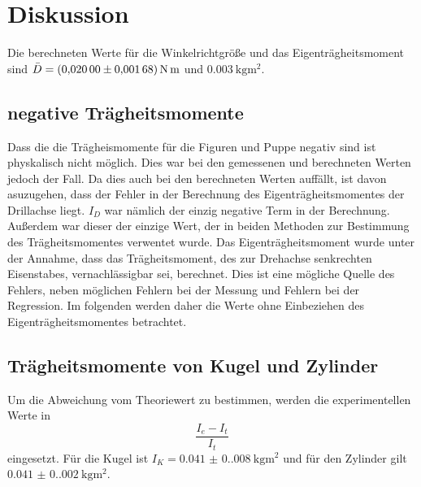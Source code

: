 \section{Diskussion}
\label{sec:Diskussion}

    Die berechneten Werte für die Winkelrichtgröße und das Eigenträgheitsmoment sind $\bar{D}=\qty{0,02(0,00168)}{\newton\meter}$ und  $\qty{0,003}{\kilo\gram\meter\squared}$. 

    \subsection{negative Trägheitsmomente}
    Dass die die Trägheismomente für die Figuren und Puppe negativ sind ist physkalisch nicht möglich.
    Dies war bei den gemessenen und berechneten Werten jedoch der Fall.
    Da dies auch bei den berechneten Werten auffällt, ist davon asuzugehen, dass der Fehler in der Berechnung des Eigenträgheitsmomentes der Drillachse liegt.
    $I_D$ war nämlich der einzig negative Term in der Berechnung.
    Außerdem war dieser der einzige Wert, der in beiden Methoden zur Bestimmung des Trägheitsmomentes verwentet wurde.
    Das Eigenträgheitsmoment wurde unter der Annahme, dass das Trägheitsmoment, des zur Drehachse senkrechten Eisenstabes, vernachlässigbar sei, berechnet.
    Dies ist eine mögliche Quelle des Fehlers, neben möglichen Fehlern bei der Messung und Fehlern bei der Regression.
    Im folgenden werden daher die Werte ohne Einbeziehen des Eigenträgheitsmomentes betrachtet.

    \subsection{Trägheitsmomente von Kugel und Zylinder}
    Um die Abweichung vom Theoriewert zu bestimmen, werden die experimentellen Werte in
    \begin{equation}
        \frac{I_e-I_t}{I_t}
        \label{eqn:abweichung}
    \end{equation}
    eingesetzt.
    Für die Kugel ist $I_K=\qty{0.041(0.008)}{\kilo\gram\meter\squared}$ und für den Zylinder gilt $\qty{0.041(0.002)}{\kilo\gram\meter\squared}$.
    
